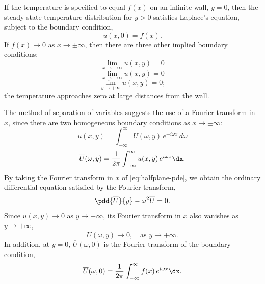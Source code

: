 If the temperature is specified to equal $f(x)$ on an infinite wall, $y = 0$, then the steady-state temperature distribution for $y > 0$ satisfies Laplace's equation,
subject to the boundary condition,
\begin{equation}
\label{eq:halfplane-bc}
u(x,0) = f(x).
\end{equation}
If $f(x) \to 0$ as $x \to \pm\infty$, then there are three other implied boundary conditions:
\begin{equation}
\label{eq:halfplane-xp}
\lim_{x\to+\infty}u(x,y) = 0
\end{equation}
\begin{equation}
\label{eq:halfplane-xm}
\lim_{x\to-\infty}u(x,y) = 0
\end{equation}
\begin{equation}
\label{eq:halfplane-yp}
\lim_{y\to+\infty}u(x,y) = 0;
\end{equation}
the temperature approaches zero at large distances from the wall.

The method of separation of variables suggests the use of a Fourier transform in $x$, since there are two homogeneous boundary conditions as $x \to \pm\infty$:
\begin{equation}
\label{eq:halfplane-ft}
u(x,y) = \int_{-\infty}^{\infty}\overline{U}(\omega,y)\,e^{-i\omega x}\,d\omega
\end{equation}
\begin{equation}
\label{eq:halfplane-ft-def}
\overline{U}(\omega,y) = \frac{1}{2\pi}\int_{-\infty}^{\infty}u(x,y)\,e^{i\omega x}\dx.
\end{equation}
By taking the Fourier transform in $x$ of \eqref{eq:halfplane-pde}, we obtain the ordinary differential equation satisfied by the Fourier transform,
\begin{equation}
\label{eq:halfplane-ode}
\pdd{\overline{U}}{y} - \omega^2\overline{U} = 0.
\end{equation}
Since $u(x,y) \to 0$ as $y \to +\infty$, its Fourier transform in $x$ also vanishes as $y \to +\infty$,
\begin{equation}
\label{eq:halfplane-decay}
\overline{U}(\omega,y) \to 0, \quad \text{as } y \to +\infty.
\end{equation}
In addition, at $y = 0$, $\overline{U}(\omega,0)$ is the Fourier transform of the boundary condition,
\begin{equation}
\label{eq:halfplane-ft-bc}
\overline{U}(\omega,0) = \frac{1}{2\pi}\int_{-\infty}^{\infty}f(x)\,e^{i\omega x}\dx.
\end{equation}

